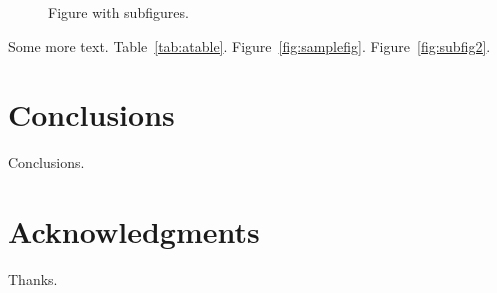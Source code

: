 \documentclass{sig-alternate-05-2015}
\begin{document}
\begin{figure}[!t]
    \centering
    \hspace*{\fill}
    \caption{Figure with subfigures. }
    \label{fig:subfig}
\end{figure}

Some more text. Table~\ref{tab:atable}. Figure~\ref{fig:samplefig}. Figure~\ref{fig:subfig2}.

\section{Conclusions}
Conclusions.

\section{Acknowledgments}
Thanks.




\balancecolumns
\end{document}
